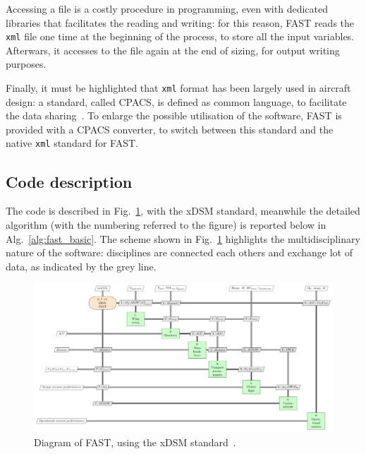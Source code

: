 Accessing a file is a costly procedure in programming, even with dedicated libraries that facilitates the reading and writing: for this reason, FAST reads the \texttt{xml} file one time at the beginning of the process, to store all the input variables.
Afterwars, it accesses to the file again at the end of sizing, for output writing purposes. 

Finally, it must be highlighted that \texttt{xml} format has been largely used in aircraft design: a standard, called CPACS, is defined as common language, to facilitate the data sharing~\cite{bib:nagel_cpacs}. 
To enlarge the possible utilisation of the software, FAST is provided with a CPACS converter, to switch between this standard and the native \texttt{xml} standard for FAST. 

\subsection{Code description}
\label{subsec:chap2_fast_mod_desc}

The code is described in Fig.~\ref{fig:fast_basic}, with the xDSM standard, meanwhile the detailed algorithm (with the numbering referred to the figure) is reported below in Alg.~\ref{alg:fast_basic}. 
The scheme shown in Fig.~\ref{fig:fast_basic} highlights the multidisciplinary nature of the software: disciplines are connected each others and exchange lot of data, as indicated by the grey line. 
\begin{figure}[!h]
	\centering
	\includegraphics[keepaspectratio, width=1.2\textwidth, angle=90]{images/chap2/FAST}
	\caption{Diagram of FAST, using the xDSM standard~\cite{bib:lambe_xdsm}.}
	\label{fig:fast_basic}
\end{figure}

